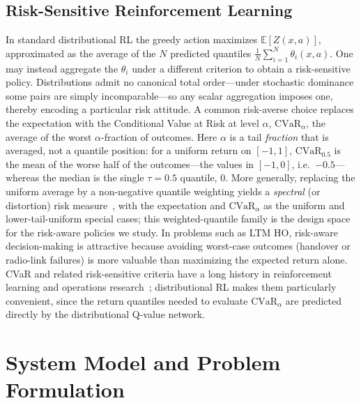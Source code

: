 \documentclass[conference]{IEEEtran}
\begin{document}
\subsection{Risk-Sensitive Reinforcement Learning}
\label{sec:rel-risk}
In standard distributional RL the greedy action maximizes $\mathbb{E}[Z(x,a)]$,
approximated as the average of the $N$ predicted quantiles
$\tfrac{1}{N}\sum_{i=1}^{N}\theta_i(x,a)$.
One may instead aggregate the $\theta_i$ under a different criterion to obtain a
risk-sensitive policy. Distributions admit no canonical total order---under
stochastic dominance some pairs are simply incomparable---so any scalar
aggregation imposes one, thereby encoding a particular risk attitude.
A common risk-averse choice replaces the expectation with the Conditional Value
at Risk at level $\alpha$, $\mathrm{CVaR}_\alpha$, the average of the worst
$\alpha$-fraction of outcomes. Here $\alpha$ is a tail \emph{fraction} that is
averaged, not a quantile position: for a uniform return on $[-1,1]$,
$\mathrm{CVaR}_{0.5}$ is the mean of the worse half of the outcomes---the values
in $[-1,0]$, i.e.\ $-0.5$---whereas the median is the single $\tau{=}0.5$
quantile, $0$.
More generally, replacing the uniform average by a non-negative quantile
weighting yields a \emph{spectral} (or distortion) risk measure~\cite{acerbi},
with the expectation and $\mathrm{CVaR}_\alpha$ as the uniform and
lower-tail-uniform special cases; this weighted-quantile family is the design
space for the risk-aware policies we study.
In problems such as LTM HO, risk-aware decision-making is attractive because
avoiding worst-case outcomes (handover or radio-link failures) is more valuable
than maximizing the expected return alone.
CVaR and related risk-sensitive criteria have a long history in reinforcement
learning and operations research~\cite{rockafellar,chow2014,tamar2015};
distributional RL makes them particularly convenient, since the return quantiles
needed to evaluate $\mathrm{CVaR}_\alpha$ are predicted directly by the
distributional Q-value network.

\section{System Model and Problem Formulation}
\label{sec:model}
\end{document}

